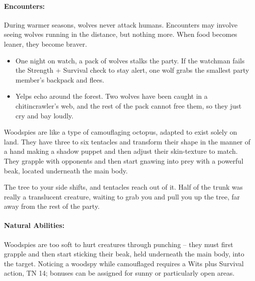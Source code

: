 \begin{multicols}{2}

\paragraph{Encounters:} During warmer seasons, wolves never attack humans.
Encounters may involve seeing wolves running in the distance, but nothing more.
When food becomes leaner, they become braver.

\begin{itemize}

	\item{One night on watch, a pack of wolves stalks the party. If the watchman fails the Strength + Survival check to stay alert, one wolf grabs the smallest party member's backpack and flees.}
	\item{Yelps echo around the forest.
	Two wolves have been caught in a chitincrawler's web, and the rest of the pack cannot free them, so they just cry and bay loudly.}
\end{itemize}

\label{woodspy}

Woodspies are like a type of camouflaging octopus, adapted to exist solely on land.  They have three to six tentacles and transform their shape in the manner of a hand making a shadow puppet and then adjust their skin-texture to match.  They grapple with opponents and then start gnawing into prey with a powerful beak, located underneath the main body.

\begin{boxtext}

	The tree to your side shifts, and tentacles reach out of it.
	Half of the trunk was really a translucent creature, waiting to grab you and pull you up the tree, far away from the rest of the party.

\end{boxtext}

\paragraph{Natural Abilities:} Woodspies are too soft to hurt creatures through punching -- they must first grapple and then start sticking their beak, held underneath the main body, into the target.
Noticing a woodspy while camouflaged requires a Wits plus Survival action, TN 14; bonuses can be assigned for sunny or particularly open areas.

\woodspy


\end{multicols}
